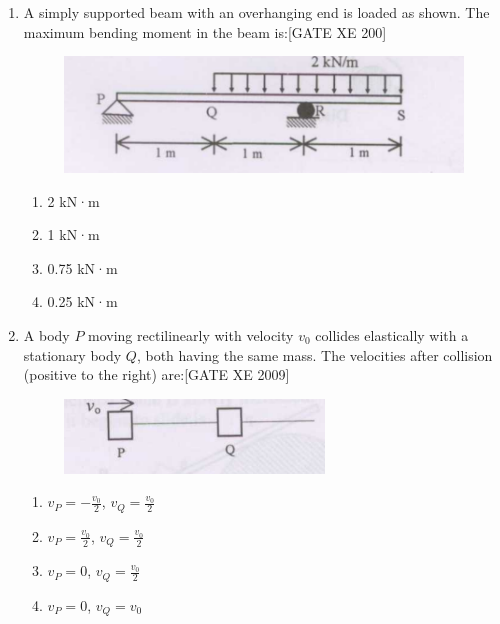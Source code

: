 \documentclass[journal,12pt,onecolumn]{IEEEtran}
\theoremstyle{remark}
\begin{document}
\begin{enumerate}
\bigskip

\item A simply supported beam with an overhanging end is loaded as shown. The maximum bending moment in the beam is:\hfill[GATE XE 200]

\begin{figure}[H]
    \centering
    \includegraphics[width=0.5\linewidth]{figs/fig16.png}
    \caption*{}
    \label{fig:Q 75}
\end{figure}
\begin{multicols}{2}
\begin{enumerate}
    \item 2 kN·m
    \item 1 kN·m
    \item 0.75 kN·m
    \item 0.25 kN·m
\end{enumerate}
\end{multicols}




\item A body $P$ moving rectilinearly with velocity $v_0$ collides elastically with a stationary body $Q$, both having the same mass. The velocities after collision (positive to the right) are:\hfill[GATE XE 2009]


\begin{figure}[H]
    \centering
    \includegraphics[width=0.5\linewidth]{figs/fig17.png}
    \caption*{}
    \label{fig:Q 76}
\end{figure}
\begin{multicols}{2}
\begin{enumerate}
    \item $v_P = -\frac{v_0}{2}$, $v_Q = \frac{v_0}{2}$
    \item $v_P = \frac{v_0}{2}$, $v_Q = \frac{v_0}{2}$
    \item $v_P = 0$, $v_Q = \frac{v_0}{2}$
    \item $v_P = 0$, $v_Q = v_0$
\end{enumerate}
\end{multicols}





\end{enumerate}
\end{document}
